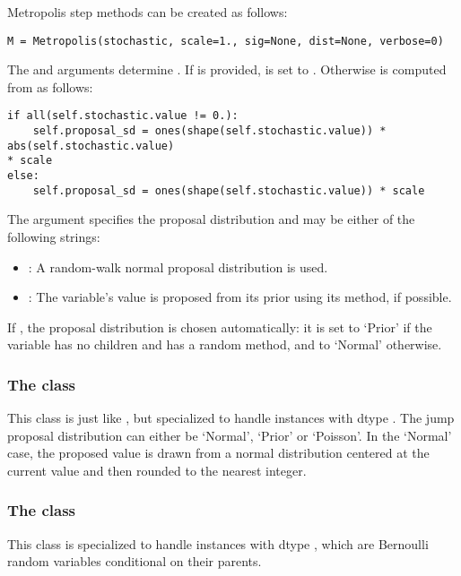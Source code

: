 Metropolis step methods can be created as follows:
\begin{verbatim}
M = Metropolis(stochastic, scale=1., sig=None, dist=None, verbose=0)
\end{verbatim}
The  and  arguments determine . If  is provided,  is set to . Otherwise  is computed from  as follows:
\begin{verbatim}
if all(self.stochastic.value != 0.):
    self.proposal_sd = ones(shape(self.stochastic.value)) * abs(self.stochastic.value) 
* scale
else:
    self.proposal_sd = ones(shape(self.stochastic.value)) * scale
\end{verbatim}

The  argument specifies the proposal distribution and may be either of the following strings:
\begin{itemize}
    \item {}: A random-walk normal proposal distribution is used.
    \item {}: The variable's value is proposed from its prior using its  method, if possible.
\end{itemize}
If , the proposal distribution is chosen automatically: 
it is set to `Prior' if the variable has no children and has a random
method, and to `Normal' otherwise. 

\subsubsection[The DiscreteMetropolis class]{The
 class}
This class is just like , but specialized to handle
 instances with dtype . The jump proposal
distribution can either be `Normal', `Prior' or `Poisson'. In the
`Normal' case, the proposed value is drawn from a normal distribution
centered at the current value and then rounded to the
nearest integer.

\subsubsection[The BinaryMetropolis class]{The
 class} 
This class is specialized to handle  instances with dtype , which are Bernoulli random variables conditional on their parents. 

